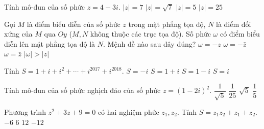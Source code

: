 \begin{ex}%
	Tính mô-đun của số phức $z=4-3i$.
	\choice
	{$|z|=7 $}
	{$|z|=\sqrt{7} $}
	{\True $|z|=5 $}
	{ $|z|=25 $}
\end{ex}

\begin{ex}%
	Gọi $M$ là điểm biểu diễn của số phức $z$ trong mặt phẳng tọa độ, $N$ là điểm đối xứng của $M$ qua $Oy$ ($M,N$ không thuộc các trục tọa độ). Số phức $\omega$ có điểm biểu diễn lên mặt phẳng tọa độ là $N$. Mệnh đề nào sau đây đúng?
	\choice
	{$\omega=-z $}
	{\True $\omega=-\bar{z} $}
	{$\omega=\bar{z}$}
	{ $|\omega|>|z| $}
\end{ex}

\begin{ex}%
	Tính $S=1+i+i^2+ \cdots +i^{2017}+i^{2018}$.
	\choice
	{$S=-i $}
	{$S=1+i $}
	{$S=1-i $}
	{\True $S=i $}
\end{ex}

\begin{ex}%
	Tính mô-đun của số phức nghịch đảo của số phức $z=(1-2i)^2$.
	\choice
	{$\dfrac{1}{\sqrt{5}} $}
	{$\dfrac{1}{25} $}
	{$\sqrt{5} $}
	{\True $\dfrac{1}{5}$}
\end{ex}

\begin{ex}%
	Phương trình $z^2+3z+9=0$ có hai nghiệm phức $z_1,z_2$. Tính $S=z_1z_2+z_1+z_2$.
	\choice
	{$ -6$}
	{\True $ 6$}
	{$ 12$}
	{ $ -12$}
\end{ex}

